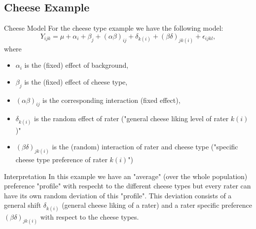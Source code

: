 \documentclass[unknownkeysallowed]{beamer}
\begin{document}
\subsection{Cheese Example}
\begin{frame}{Cheese Model}
	For the cheese type example we have the following model:
	\begin{equation*}
		Y_{ijk} = \mu + \alpha_i + \beta_j + (\alpha \beta)_{ij} +\delta_{k(i)} + (\beta \delta)_{jk(i)} + \epsilon_{ijkl},
	\end{equation*}
	where
	\begin{itemize}
		\item $\alpha_i$ is the (fixed) effect of background,
		\item $\beta_j$ is the (fixed) effect of cheese type,
		\item $(\alpha \beta)_{ij}$ is the corresponding interaction (fixed effect),
		\item $\delta_{k(i)}$ is the random effect of rater ("general cheese liking level of rater $k(i)$)"
		\item $(\beta \delta)_{jk(i)}$ is the (random) interaction of rater and cheese type ("specific cheese type preference of rater $k(i)$")
	\end{itemize}
\end{frame}

\begin{frame}{Interpretation}
	In this example we have an "average" (over the whole population) preference "profile" with respecht to the different cheese types but every rater can have its own random deviation of this "profile". This deviation consists of a general shift $\delta_{k(i)}$ (general cheese liking of a rater) and a rater specific preference $(\beta \delta)_{jk(i)}$ with respect  to the cheese types.
\end{frame}
\end{document}
